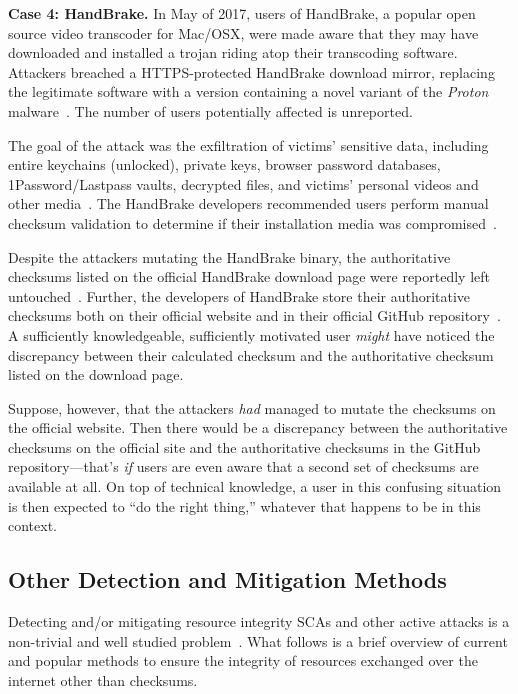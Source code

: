 \noindent\textbf{Case 4: HandBrake.} In May of 2017, users of HandBrake, a
popular open source video transcoder for Mac/OSX, were made aware that they may
have downloaded and installed a trojan riding atop their transcoding software.
Attackers breached a HTTPS-protected HandBrake download mirror, replacing the
legitimate software with a version containing a novel variant of the
\emph{Proton} malware~\cite{SCA-HB1}. The number of users potentially affected
is unreported.

The goal of the attack was the exfiltration of victims' sensitive data,
including entire keychains (unlocked), private keys, browser password databases,
1Password/Lastpass vaults, decrypted files, and victims' personal videos and
other media~\cite{SCA-HB1}. The HandBrake developers recommended users perform
manual checksum validation to determine if their installation media was
compromised~\cite{SCA-HB2}.

Despite the attackers mutating the HandBrake binary, the authoritative checksums
listed on the official HandBrake download page were reportedly left
untouched~\cite{SCA-HB2}. Further, the developers of HandBrake store their
authoritative checksums both on their official website and in their official
GitHub repository~\cite{SCA-HB2}. A sufficiently knowledgeable, sufficiently
motivated user \emph{might} have noticed the discrepancy between their
calculated checksum and the authoritative checksum listed on the download page.

Suppose, however, that the attackers \textit{had} managed to mutate the
checksums on the official website. Then there would be a discrepancy between the
authoritative checksums on the official site and the authoritative checksums in
the GitHub repository---that's \emph{if} users are even aware that a second set
of checksums are available at all. On top of technical knowledge, a user in this
confusing situation is then expected to ``do the right thing,'' whatever that
happens to be in this context.

\subsection{Other Detection and Mitigation Methods}

Detecting and/or mitigating resource integrity SCAs and other active attacks is
a non-trivial and well studied problem~\cite{MD5Header, HTTP1.1, HTTPS, SRI, LF,
OpenPGP1, DNSSEC, PKI}. What follows is a brief overview of current and popular
methods to ensure the integrity of resources exchanged over the internet other
than checksums.

